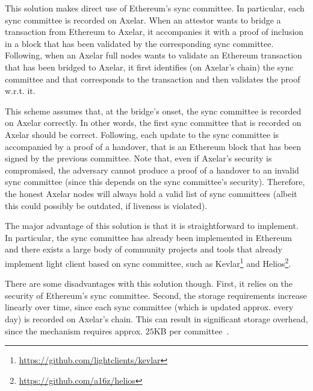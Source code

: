 This solution makes direct use of Ethereum's sync committee. In particular,
each sync committee is recorded on Axelar. When an attestor wants to bridge a
transaction from Ethereum to Axelar, it accompanies it with a proof of
inclusion in a block that has been validated by the corresponding sync
committee. Following, when an Axelar full nodes wants to validate an Ethereum
transaction that has been bridged to Axelar, it first identifies (on Axelar's
chain) the sync committee and that corresponds to the transaction and then
validates the proof w.r.t. it.

This scheme assumes that, at the bridge's onset, the sync committee is recorded
on Axelar correctly. In other words, the first sync committee that is recorded
on Axelar should be correct. Following, each update to the sync committee is
accompanied by a proof of a handover, that is an Ethereum block that has been
signed by the previous committee. Note that, even if Axelar's security is
compromised, the adversary cannot produce a proof of a handover to an invalid
sync committee (since this depends on the sync committee's security).
Therefore, the honest Axelar nodes will always hold a valid list of sync
committees (albeit this could possibly be outdated, if liveness is violated).


The major advantage of this solution is that it is straightforward to
implement. In particular, the sync committee has already been implemented in
Ethereum and there exists a large body of community projects and tools that
already implement light client based on sync committee, such as
Kevlar\footnote{\url{https://github.com/lightclients/kevlar}} and
Helios\footnote{\url{https://github.com/a16z/helios}}.

There are some disadvantages with this solution though. First, it relies on the
security of Ethereum's sync committee. Second, the storage requirements
increase linearly over time, since each sync committee (which is updated
approx. every day) is recorded on Axelar's chain. This can result in
significant storage overhead, since the mechanism requires approx. $25$KB per
committee~\cite{sync-committee}.

